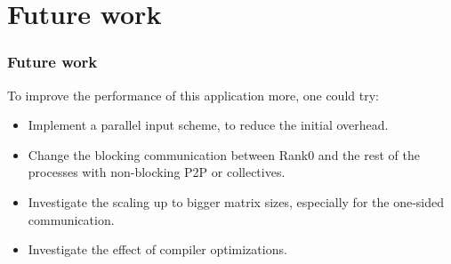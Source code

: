 \documentclass[10pt, compress]{beamer}
\begin{document}
\section{Future work}
\begin{frame}
  \frametitle{Future work}
  To improve the performance of this application more, one could try:
  \begin{itemize}
  \item Implement a parallel input scheme, to reduce the initial overhead.
  \item Change the blocking communication between Rank0 and the rest of the processes with non-blocking P2P or collectives.
  \item Investigate the scaling up to bigger matrix sizes, especially for the one-sided communication.
  \item Investigate the effect of compiler optimizations.
  \end{itemize}

\end{frame}
\end{document}
